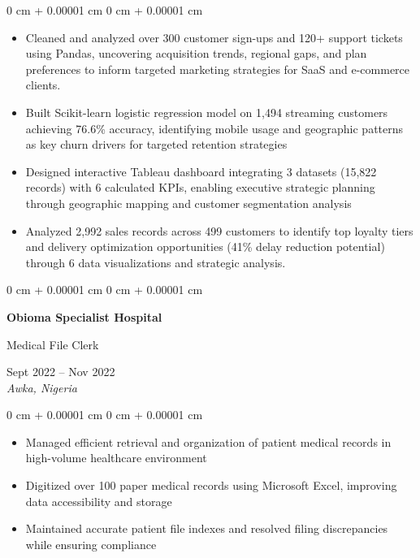 \documentclass[10pt, a4paper]{article}
\newenvironment{highlights}{
    \begin{itemize}[
        topsep=0.10 cm,
        parsep=0.10 cm,
        partopsep=0pt,
        itemsep=0pt,
        leftmargin=20pt
    ]
}{
    \end{itemize}
} %
\newenvironment{onecolentry}{
    \begin{adjustwidth}{
        0 cm + 0.00001 cm
    }{
        0 cm + 0.00001 cm
    }
}{
    \end{adjustwidth}
} %
\newenvironment{twocolentry}[2][]{
    \onecolentry
    \def\secondColumn{#2}
    \setcolumnwidth{\fill, 4.5 cm}
    \begin{paracol}{2}
}{
    \switchcolumn \raggedleft \secondColumn
    \end{paracol}
    \endonecolentry
} %
\begin{document}
    \vspace{0.10 cm}
    \begin{onecolentry}
        \begin{highlights}
            \item Cleaned and analyzed over 300 customer sign-ups and 120+ support tickets using Pandas, uncovering acquisition trends, regional gaps, and plan preferences to inform targeted marketing strategies for SaaS and e-commerce clients.
            \item Built Scikit-learn logistic regression model on 1,494 streaming customers achieving 76.6\% accuracy, identifying mobile usage and geographic patterns as key churn drivers for targeted retention strategies
            \item Designed interactive Tableau dashboard integrating 3 datasets (15,822 records) with 6 calculated KPIs, enabling executive strategic planning through geographic mapping and customer segmentation analysis
            \item Analyzed 2,992 sales records across 499 customers to identify top loyalty tiers and delivery optimization opportunities (41\% delay reduction potential) through 6 data visualizations and strategic analysis.
        \end{highlights}
    \end{onecolentry}

    \vspace{0.2 cm}

    \begin{twocolentry}{
        Sept 2022 -- Nov 2022 \\
        \textit{Awka, Nigeria}
    }
        \textbf{Obioma Specialist Hospital}
        
        Medical File Clerk
    \end{twocolentry}

    \vspace{0.10 cm}
    \begin{onecolentry}
        \begin{highlights}
            \item Managed efficient retrieval and organization of patient medical records in high-volume healthcare environment
            \item Digitized over 100 paper medical records using Microsoft Excel, improving data accessibility and storage
            \item Maintained accurate patient file indexes and resolved filing discrepancies while ensuring compliance
        \end{highlights}
    \end{onecolentry}
\end{document}
